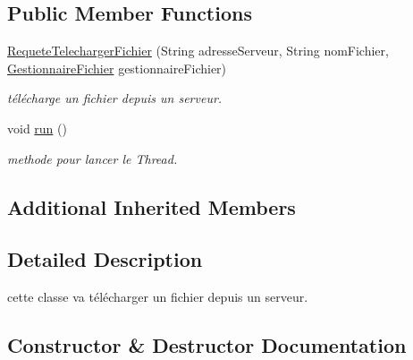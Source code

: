 \subsection*{Public Member Functions}
\begin{DoxyCompactItemize}
\item 
\hyperlink{classrequete_1_1RequeteTelechargerFichier_ad2f914dd2883d44935c00df622f8c60a}{Requete\+Telecharger\+Fichier} (String adresse\+Serveur, String nom\+Fichier, \hyperlink{classcommon_1_1GestionnaireFichier}{Gestionnaire\+Fichier} gestionnaire\+Fichier)
\begin{DoxyCompactList}\small\item\em télécharge un fichier depuis un serveur. \end{DoxyCompactList}\item 
\mbox{\label{classrequete_1_1RequeteTelechargerFichier_a46bf87e436bf43a7695f7f7d264f5e2c}} 
void \hyperlink{classrequete_1_1RequeteTelechargerFichier_a46bf87e436bf43a7695f7f7d264f5e2c}{run} ()
\begin{DoxyCompactList}\small\item\em methode pour lancer le Thread. \end{DoxyCompactList}\end{DoxyCompactItemize}
\subsection*{Additional Inherited Members}


\subsection{Detailed Description}
cette classe va télécharger un fichier depuis un serveur. 

\subsection{Constructor \& Destructor Documentation}
\mbox{\label{classrequete_1_1RequeteTelechargerFichier_ad2f914dd2883d44935c00df622f8c60a}} 
